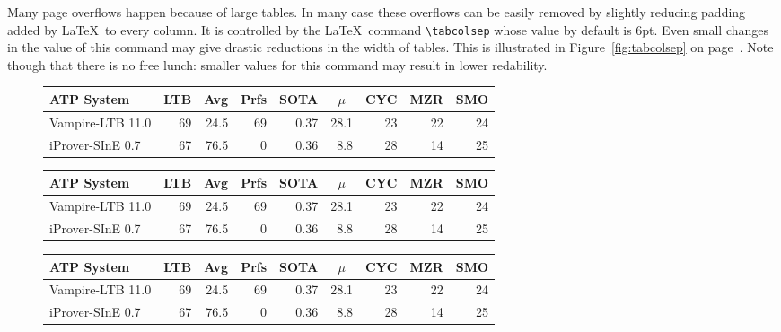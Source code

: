 \documentclass{imav2013}
\begin{document}
Many page overflows happen because of large tables. In many case these
overflows can be easily removed by slightly reducing padding added by
\LaTeX\ to every column. It is controlled by the \LaTeX\ command
\verb|\tabcolsep| whose value by default is 6pt. Even small changes in
the value of this command may give drastic reductions in the width of
tables. This is illustrated in Figure~\ref{fig:tabcolsep} on
page~\pageref{fig:tabcolsep}. Note though that there is no free lunch:
smaller values for this command may result in lower redability.

\begin{figure}[tb]\small
\begin{center}
  \begin{tabular}{lrrrrrrrr}
    \hline
    ATP System            & LTB & Avg  &Prfs & SOTA & \multicolumn{1}{c}{$\mu$} & CYC & MZR & SMO \\
   \hline
    Vampire-LTB 11.0      &  69 & 24.5 &  69 & 0.37 & 28.1 &  23 &  22 &  24 \\
    iProver-SInE 0.7      &  67 & 76.5 &   0 & 0.36 &  8.8 &  28 &  14 &  25 \\
   \hline
  \end{tabular}
\end{center}

\begin{center}\renewcommand{\tabcolsep}{5pt}
  \begin{tabular}{lrrrrrrrr}
    \hline
    ATP System            & LTB & Avg  &Prfs & SOTA & \multicolumn{1}{c}{$\mu$} & CYC & MZR & SMO \\
   \hline
    Vampire-LTB 11.0      &  69 & 24.5 &  69 & 0.37 & 28.1 &  23 &  22 &  24 \\
    iProver-SInE 0.7      &  67 & 76.5 &   0 & 0.36 &  8.8 &  28 &  14 &  25 \\
   \hline
  \end{tabular}
\end{center}

\begin{center}\renewcommand{\tabcolsep}{3pt}
  \begin{tabular}{lrrrrrrrr}
    \hline
    ATP System            & LTB & Avg  &Prfs & SOTA & \multicolumn{1}{c}{$\mu$} & CYC & MZR & SMO \\
   \hline
    Vampire-LTB 11.0      &  69 & 24.5 &  69 & 0.37 & 28.1 &  23 &  22 &  24 \\
    iProver-SInE 0.7      &  67 & 76.5 &   0 & 0.36 &  8.8 &  28 &  14 &  25 \\
   \hline
  \end{tabular}
\end{center}


\end{figure}
\end{document}
